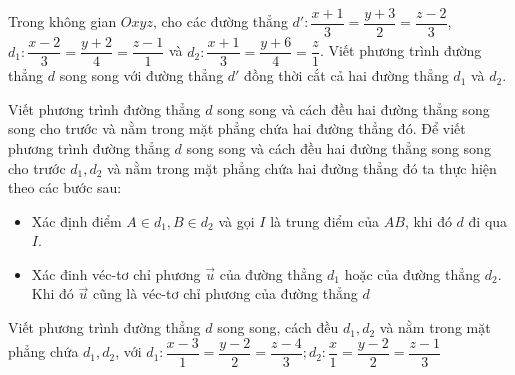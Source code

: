 \begin{bt}%
	Trong không gian $Oxyz$, cho các đường thẳng $d':\dfrac{x+1}{3}=\dfrac{y+3}{2}=\dfrac{z-2}{3}$,\newline $d_1:\dfrac{x-2}{3}=\dfrac{y+2}{4}=\dfrac{z-1}{1}$ và $d_2:\dfrac{x+1}{3}=\dfrac{y+6}{4}=\dfrac{z}{1}$. Viết phương trình đường thẳng $d$ song song với đường thẳng $d'$ đồng thời cắt cả hai đường thẳng $d_1$ và $d_2$.
\end{bt}





\begin{dang}{Viết phương trình đường thẳng $d$ song song và cách đều hai đường thẳng song song cho trước và nằm trong mặt phẳng chứa hai đường thẳng đó.}
	Để viết phương trình đường thẳng $d$ song song và cách đều hai đường thẳng song song cho trước $d_1,d_2$ và nằm trong mặt phẳng chứa hai đường thẳng đó ta thực hiện theo các bước sau:
\begin{itemize}
        \item Xác định điểm $A\in d_1, B\in d_2$ và gọi $I$ là trung điểm của $AB$, khi đó $d$ đi qua $I$.
		\item Xác đinh véc-tơ chỉ phương $\overrightarrow{u}$ của đường thẳng $d_1$ hoặc của đường thẳng $d_2$. Khi đó $\overrightarrow{u}$ cũng là véc-tơ chỉ phương của đường thẳng $d$
\end{itemize}
\end{dang}
\begin{vd}%
	Viết phương trình đường thẳng $d$ song song, cách đều $d_1, d_2$  và nằm trong mặt phẳng chứa $d_1,d_2$, với $d_1:\dfrac{x-3}{1}=\dfrac{y-2}{2}=\dfrac{z-4}{3}; d_2:\dfrac{x}{1}=\dfrac{y-2}{2}=\dfrac{z-1}{3}$
\end{vd}


